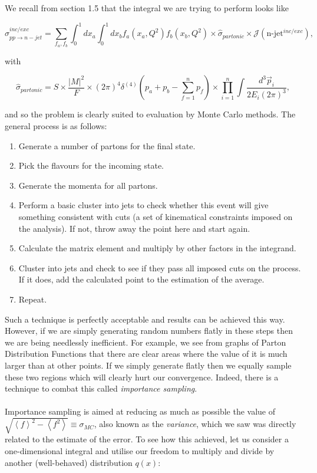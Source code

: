 We recall from section 1.5 that the integral we are trying to perform looks like

\begin{equation}
\sigma_{pp \to n-jet}^{inc/exc} = \sum_{f_a, f_b} \int_0^1 dx_a \int_0^1 dx_b f_a(x_a, Q^2) f_b(x_b, Q^2) \times \hat{\sigma}_{partonic} \times \mathcal{J}(\text{n-jet}^{inc/exc}),
\end{equation}

with

\begin{equation}
\hat{\sigma}_{partonic} = S \times \frac{|M|^2}{F} \times (2 \pi)^4 \delta^{(4)}(p_a + p_b - \sum_{f=1}^n p_f) \times \prod_{i=1}^n \int \frac{d^3 \vec{p}_i}{2 E_i (2 \pi)^3},
\end{equation}

and so the problem is clearly suited to evaluation by Monte Carlo methods. The general process is as follows:

\begin{enumerate} 
\item{Generate a number of partons for the final state.}
\item{Pick the flavours for the incoming state.}
\item{Generate the momenta for all partons.}
\item{Perform a basic cluster into jets to check whether this event will give something consistent with cuts (a set of kinematical constraints imposed on the analysis). If not, throw away the point here and start again.}
\item{Calculate the matrix element and multiply by other factors in the integrand.}
\item{Cluster into jets and check to see if they pass all imposed cuts on the process. If it does, add the calculated point to the estimation of the average.}
\item{Repeat.}

\end{enumerate}

Such a technique is perfectly acceptable and results can be achieved this way. However, if we are simply generating random numbers flatly in these steps then we are being needlessly inefficient. For example, we see from graphs of Parton Distribution Functions that there are clear areas where the value of it is much larger than at other points. If we simply generate flatly then we equally sample these two regions which will clearly hurt our convergence. Indeed, there is a technique to combat this called \emph{importance sampling}. \\
\\
Importance sampling is aimed at reducing as much as possible the value of $\sqrt{\left<f \right>^2 - \left<f^2 \right>} \equiv \sigma_{MC}$, also known as the \emph{variance}, which we saw was directly related to the estimate of the error. To see how this achieved, let us consider a one-dimensional integral and utilise our freedom to multiply and divide by another (well-behaved) distribution $q(x)$:


